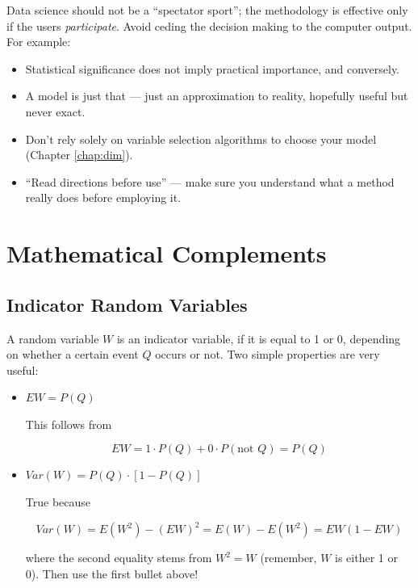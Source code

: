 Data science should not be a ``spectator sport''; the methodology is
effective only if the users {\it participate}.  Avoid ceding the
decision making to the computer output.  For example:

\begin{itemize}

\item Statistical significance does not imply practical importance, and
conversely.

\item A model is just that --- just an approximation to reality,
hopefully useful but never exact.

\item Don't rely solely on variable selection algorithms to choose your
model (Chapter \ref{chap:dim}).

\item ``Read directions before use'' --- make sure you understand what a
method really does before employing it.

\end{itemize}

\section{Mathematical Complements}
\label{mcintro}

\subsection{Indicator Random Variables}
\label{indicvars}

A random variable $W$ is an indicator variable, if it is equal to 1 or
0, depending on whether a certain event $Q$ occurs or not.  Two simple
properties are very useful:

\begin{itemize}

\item $EW = P(Q)$

This follows from

\begin{equation}
EW = 1 \cdot P(Q) + 0 \cdot P(\textrm{not } Q) = P(Q)
\end{equation}

\item $Var(W) = P(Q) \cdot [1 - P(Q)]$

True because 

\begin{equation}
Var(W) = E(W^2) - (EW)^2 = E(W) - E(W^2) = EW (1 - EW)
\end{equation}

where the second equality stems from $W^2 = W$ (remember, $W$ is either
1 or 0).  Then use the first bullet above!

\end{itemize}


